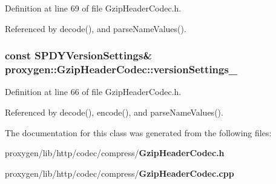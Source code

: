 Definition at line 69 of file Gzip\+Header\+Codec.\+h.



Referenced by decode(), and parse\+Name\+Values().

\subsubsection[{version\+Settings\+\_\+}]{\setlength{\rightskip}{0pt plus 5cm}const {\bf S\+P\+D\+Y\+Version\+Settings}\& proxygen\+::\+Gzip\+Header\+Codec\+::version\+Settings\+\_\+\hspace{0.3cm}{\ttfamily [private]}}\label{classproxygen_1_1GzipHeaderCodec_ac4d8507560a3163c4f17632805a13e3c}


Definition at line 66 of file Gzip\+Header\+Codec.\+h.



Referenced by decode(), encode(), and parse\+Name\+Values().



The documentation for this class was generated from the following files\+:\begin{DoxyCompactItemize}
\item 
proxygen/lib/http/codec/compress/{\bf Gzip\+Header\+Codec.\+h}\item 
proxygen/lib/http/codec/compress/{\bf Gzip\+Header\+Codec.\+cpp}\end{DoxyCompactItemize}
